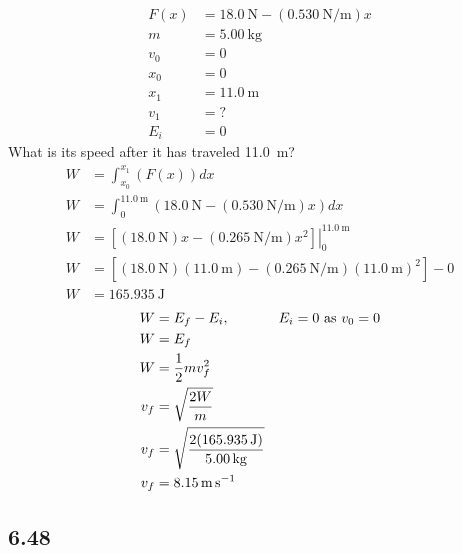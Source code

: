 \documentclass{article}
\begin{document}
\begin{align*}
	F(x) & = \SI{18.0}{\newton} - (\SI{0.530}{\newton \per \meter})x \\
	m & = \SI{5.00}{\kilogram} \\
	v_0 & = 0 \\
	x_0 & = 0 \\
	x_1 & = \SI{11.0}{\meter} \\
	v_1 & = ? \\
	E_i & = 0
\end{align*}
What is its speed after it has traveled \SI{11.0}{\meter}?
\begin{align*}
	W & = \int_{x_0}^{x_1} \left( F(x) \right) dx \\
	W & = \int_{0}^{\SI{11.0}{\meter}} \left( \SI{18.0}{\newton} - (\SI{0.530}{\newton \per \meter})x \right) dx \\
	W & = \left. \left[ (\SI{18.0}{\newton})x - (\SI{0.265}{\newton \per \meter})x^2 \right] \right|_{0}^{\SI{11.0}{\meter}} \\
	W & = \left[ (\SI{18.0}{\newton})(\SI{11.0}{\meter}) - (\SI{0.265}{\newton \per \meter})(\SI{11.0}{\meter})^2 \right] - 0 \\
	W & = \SI{165.935}{\joule}
\end{align*}
\begin{align*}
	W & = E_f - E_i, & \text{$ E_i = 0 $ as $ v_0 = 0 $} \\
	W & = E_f \\
	W & = \frac{1}{2}mv_f^2 \\
	v_f & = \sqrt{ \frac{2W}{m} } \\
	v_f & = \sqrt{ \frac{2(\SI{165.935}{\joule})}{\SI{5.00}{\kilogram}} } \\
	v_f & = \SI{8.15}{\meter \per \second}
\end{align*}

\subsection{6.48}
\end{document}
